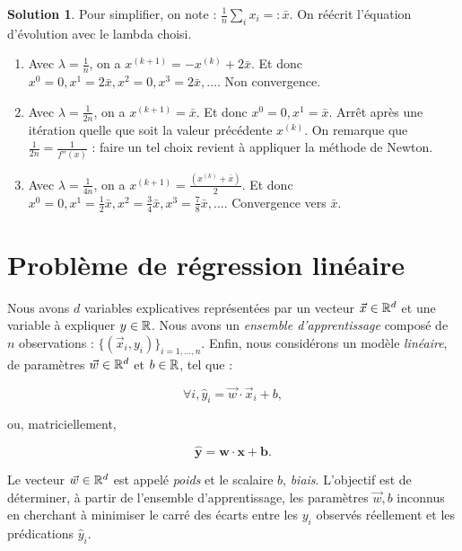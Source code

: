 \documentclass[a4paper,francais]{article}
\newcommand{\R}{{\ensuremath\mathbb{R}}}
\theoremstyle{definition}
\newtheorem*{solution}{Solution}
\begin{document}
\begin{solution}
  Pour simplifier, on note : $\frac{1}{n}\sum_ix_i =: \bar{x}$.
  On réécrit l'équation d'évolution avec le lambda choisi. 
  \begin{enumerate}
  \item Avec $\lambda = \frac{1}{n}$,
    on a $x^{(k+1)} = - x^{(k)} + 2\bar{x}$. Et donc
    $x^0 = 0, x^1 = 2\bar{x}, x^2 = 0, x^3 = 2\bar{x}, \dots$.
    Non convergence. 
  \item Avec $\lambda = \frac{1}{2n}$,
    on a $x^{(k+1)} = \bar{x}$. Et donc
    $x^0 = 0, x^1 = \bar{x}$. Arrêt après une itération
    quelle que soit la valeur précédente $x^{(k)}$.
    On remarque que $\frac{1}{2n} = \frac{1}{f''(x)}$ :
    faire un tel choix revient à appliquer la méthode de Newton. 
  \item Avec $\lambda = \frac{1}{4n}$,
    on a $x^{(k+1)} = \frac{(x^{(k)} + \bar{x})}{2}$. Et donc
    $x^0 = 0, x^1 = \frac{1}{2}\bar{x}, x^2 = \frac{3}{4}\bar{x},
    x^3 = \frac{7}{8}\bar{x}, \dots$.
    Convergence vers $\bar{x}$. 
  \end{enumerate}
\end{solution}

\section{Problème de régression linéaire}
\label{sec:regression}

\newcommand\mat[1]{\mathbf{#1}}


Nous avons $d$ variables explicatives représentées par un vecteur $\vec{x} \in \R^d$
et une variable à expliquer $y \in \R$.
Nous avons un \emph{ensemble d'apprentissage} composé de $n$ observations :
$\{(\vec{x}_i,y_i)\}_{i = 1,\dots, n}$.
Enfin, nous considérons un modèle \emph{linéaire}, de paramètres $\vec{w} \in \R^d$
et $b \in \R$, tel que :

\[ \forall i, \hat{y}_i = \vec{w} \cdot \vec{x}_i + b, \]

ou, matriciellement,

\[ \mat{\hat{y}} = \mat{w} \cdot \mat{x} + \mat{b}. \]

Le vecteur $\vec{w} \in \R^d$%
est appelé \emph{poids} et le scalaire $b$, \emph{biais}. 
L'objectif est de déterminer, à partir de l'ensemble d'apprentissage,
les paramètres $\vec{w},b$ inconnus en cherchant à minimiser le carré des
écarts entre les $y_i$ observés réellement et les prédications $\hat{y}_i$.
\end{document}
